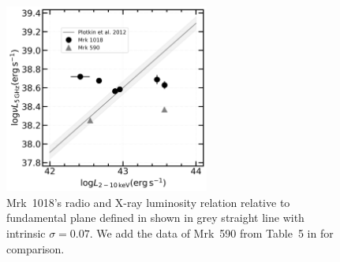 \documentclass[twocolumn]{aastex63}
\begin{document}
\begin{figure}
\centering
	\includegraphics[width=0.6\textwidth]{./pic/Mrk1018_Mrk590_radio_xray_Plotkin2012_Lx.png}
    \caption{Mrk~1018's radio and X-ray luminosity relation relative to fundamental plane defined in \citet{2012MNRAS.419..267P} shown in grey straight line with intrinsic $\sigma=0.07$. We add the data of Mrk~590 from Table~5 in \citet{2016MNRAS.460..304K} for comparison.} 
    \label{fig:radio-xray-mass_relation_Plotkin2012}
\end{figure}



%





\end{document}

